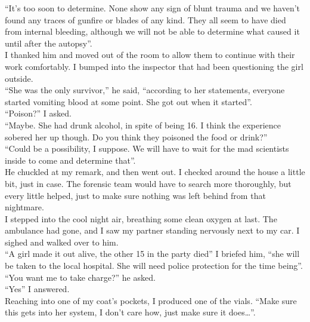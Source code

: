 \documentclass[a4paper,onecolumn,11pt]{article}
\begin{document}
``It's too soon to determine. None show any sign of blunt trauma and we haven't found any traces of gunfire or blades of any kind. They all seem to have died from internal bleeding, although we will not be able to determine what caused it until after the autopsy''.\\
\newline
I thanked him and moved out of the room to allow them to continue with their work comfortably. I bumped into the inspector that had been questioning the girl outside.\\
``She was the only survivor,'' he said, ``according to her statements, everyone started vomiting blood at some point. She got out when it started''.\\
``Poison?'' I asked.\\
``Maybe. She had drunk alcohol, in spite of being 16. I think the experience sobered her up though. Do you think they poisoned the food or drink?''\\
``Could be a possibility, I suppose. We will have to wait for the mad scientists inside to come and determine that''.\\
He chuckled at my remark, and then went out. I checked around the house a little bit, just in case. The forensic team would have to search more thoroughly, but every little helped, just to make sure nothing was left behind from that nightmare.\\
\newline
I stepped into the cool night air, breathing some clean oxygen at last. The ambulance had gone, and I saw my partner standing nervously next to my car. I sighed and walked over to him.\\
\newline
``A girl made it out alive, the other 15 in the party died'' I briefed him, ``she will be taken to the local hospital. She will need police protection for the time being''.\\
``You want me to take charge?'' he asked.\\
``Yes'' I answered.\\
\newline
Reaching into one of my coat's pockets, I produced one of the vials. ``Make sure this gets into her system, I don't care how, just make sure it does\ldots''.

\newpage

\end{document}
